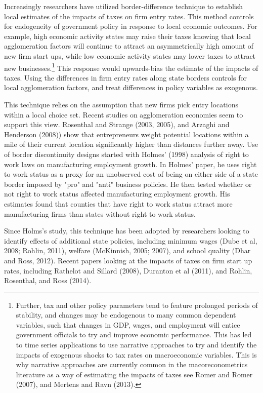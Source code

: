 Increasingly researchers have utilized border-difference technique to establish local estimates of the impacts of taxes on firm entry rates. This method controls for endogeneity of government policy in response to local economic outcomes. For example, high economic activity states may raise their taxes knowing that local agglomeration factors will continue to attract an asymmetrically high amount of new firm start ups, while low economic activity states may lower taxes to attract new businesses.\footnote{Further, tax and other policy parameters tend to feature prolonged periods of stability, and changes may be endogenous to many common dependent variables, such that changes in GDP, wages, and employment will entice government officials to try and improve economic performance. This has led to time series applications to use narrative approaches to try and identify the impacts of exogenous shocks to tax rates on macroeconomic variables. This is why narrative approaches are currently common in the macoreconometrics literature as a way of estimating the impacts of taxes see Romer and Romer (2007), and Mertens and Ravn (2013).} This response would upwards-bias the estimate of the impacts of taxes. Using the differences in firm entry rates along state borders controls for local agglomeration factors, and treat differences in policy variables as exogenous.

This technique relies on the assumption that new firms pick entry locations within a local choice set. Recent studies on agglomeration economies seem to support this view.  Rosenthal and Strange (2003, 2005), and Arzaghi and Henderson (2008)) show that entrepreneurs weight potential locations within a mile of their current location significantly higher than distances further away. Use of border discontinuity designs started with Holmes’ (1998) analysis of right to work laws on manufacturing employment growth. In Holmes' paper, he uses right to work status as a proxy for an unobserved cost of being on either side of a state border imposed by "pro" and "anti" business policies. He then tested whether or not right to work status affected manufacturing employment growth. His estimates found that counties that have right to work status attract more manufacturing firms than states without right to work status.

Since Holms's study, this technique has been adopted by researchers looking to identify effects of additional state policies, including minimum wages (Dube et al, 2008; Rohlin, 2011), welfare (McKinnish, 2005; 2007), and school quality (Dhar and Ross, 2012). Recent papers looking at the impacts of taxes on firm start up rates, including Rathelot and Sillard (2008), Duranton et al (2011), and Rohlin, Rosenthal, and Ross (2014). 


